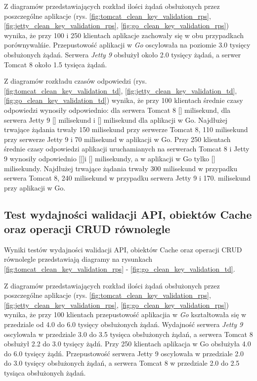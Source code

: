 Z diagramów przedstawiających rozkład ilości żądań obsłużonych przez poszczególne aplikacje  (rys. \ref{fig:tomcat_clean_key_validation_rps}, \ref{fig:jetty_clean_key_validation_rps}, \ref{fig:go_clean_key_validation_rps}) wynika, że przy 100 i 250 klientach aplikacje zachowały się w obu przypadkach porównywalńie. Przepustowość aplikacji w \textsl{Go} oscylowała na poziomie 3.0 tysięcy obsłużonych żądań. Serwera \textsl{Jetty 9} obsłużył około 2.0 tysięcy  żądań, a serwer Tomcat 8 około 1.5 tysięca żądań.


Z diagramów rozkładu czasów odpowiedzi (rys. \ref{fig:tomcat_clean_key_validation_td}, \ref{fig:jetty_clean_key_validation_td}, \ref{fig:go_clean_key_validation_td}) wynika, że przy 100 klientach średnie czasy odpowiedzi wynosiły odpowiednio: dla serwera Tomcat 8 [] milisekund, dla serwera Jetty 9 [] milisekund i [] milisekund dla aplikacji w Go.  Najdłużej trwające żądania trwały 150 milisekund przy serwerze Tomcat 8, 110 milisekund przy serwerze  Jetty 9 i 70 milisekund  w aplikacji w Go. Przy 250 klientach średnie czasy odpowiedzi aplikacji uruchamianych na serwerach Tomcat 8 i Jetty 9  wynosiły odpowiednio [[]i [] milisekundy, a w aplikacji w Go tylko [] milisekundy. Najdłużej trwające żądania trwały 300 milisekund w przypadku serwera Tomcat 8, 240 milisekund w przypadku serwera Jetty 9 i 170. milisekund przy aplikacji w Go. 

% 
\clearpage

\subsection{Test wydajności walidacji API, obiektów Cache oraz operacji CRUD równolegle }

Wyniki testów wydajności walidacji API, obiektów Cache oraz operacji CRUD równolegle przedstawiają diagramy na rysunkach \ref{fig:tomcat_clean_key_validation_rps} - \ref{fig:go_clean_key_validation_td}.              

Z diagramów przedstawiających rozkład ilości żądań obsłużonych przez poszczególne aplikacje  (rys. \ref{fig:tomcat_clean_key_validation_rps}, \ref{fig:jetty_clean_key_validation_rps}, \ref{fig:go_clean_key_validation_rps}) wynika, że przy 100 klientach przepustowość aplikacjia w \textsl{Go} kształtowała się w przedziale od 4.0 do 6.0 tysięcy obsłużonych żądań. Wydajność serwera \textsl{Jetty 9} oscylowała w przedziale 3.0 do 3.5 tysięca obsłużonych żądań, a  serwera Tomcat 8 obsłużył 2.2 do 3.0 tysięcy żądń. Przy 250 klientach aplikacja w Go obsłużyła 4.0 do 6.0 tysięcy żądń. Przepustowość serwera Jetty 9 oscylowała w przedziale 2.0 do 3.0 tysięcy obsłużonych żądań, a serwera Tomcat 8 w przedziale 2.0 do 2.5 tysiąca obsłużonych żądań.



